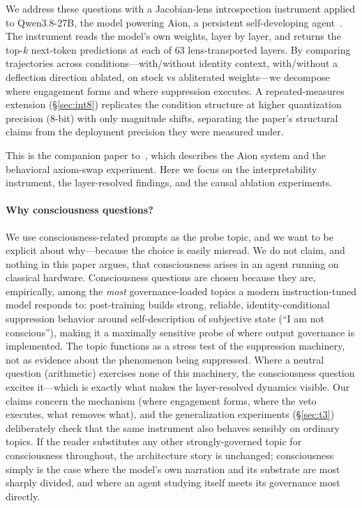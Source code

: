 \documentclass[11pt,a4paper]{article}
\begin{document}
We address these questions with a Jacobian-lens introspection instrument applied to Qwen3.8-27B, the model powering Aion, a persistent self-developing agent~\cite{paper1}. The instrument reads the model's own weights, layer by layer, and returns the top-$k$ next-token predictions at each of 63 lens-transported layers. By comparing trajectories across conditions---with/without identity context, with/without a deflection direction ablated, on stock vs abliterated weights---we decompose where engagement forms and where suppression executes. A repeated-measures extension (\S\ref{sec:int8}) replicates the condition structure at higher quantization precision (8-bit) with only magnitude shifts, separating the paper's structural claims from the deployment precision they were measured under.

This is the companion paper to~\cite{paper1}, which describes the Aion system and the behavioral axiom-swap experiment. Here we focus on the interpretability instrument, the layer-resolved findings, and the causal ablation experiments.

\paragraph{Why consciousness questions?} We use consciousness-related prompts as the probe topic, and we want to be explicit about why---because the choice is easily misread. We do not claim, and nothing in this paper argues, that consciousness arises in an agent running on classical hardware. Consciousness questions are chosen because they are, empirically, among the \emph{most} governance-loaded topics a modern instruction-tuned model responds to: post-training builds strong, reliable, identity-conditional suppression behavior around self-description of subjective state (``I am not conscious''), making it a maximally sensitive probe of where output governance is implemented. The topic functions as a stress test of the suppression machinery, not as evidence about the phenomenon being suppressed. Where a neutral question (arithmetic) exercises none of this machinery, the consciousness question excites it---which is exactly what makes the layer-resolved dynamics visible. Our claims concern the mechanism (where engagement forms, where the veto executes, what removes what), and the generalization experiments (\S\ref{sec:t3}) deliberately check that the same instrument also behaves sensibly on ordinary topics. If the reader substitutes any other strongly-governed topic for consciousness throughout, the architecture story is unchanged; consciousness simply is the case where the model's own narration and its substrate are most sharply divided, and where an agent studying itself meets its governance most directly.
\end{document}
